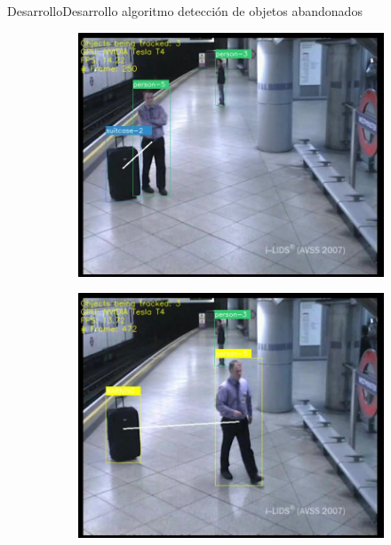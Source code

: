 \begin{frame}{Desarrollo}{Desarrollo algoritmo detección de objetos abandonados}
\begin{figure}[ht]
  \centering
  \begin{subfigure}[b]{0.28\textwidth}
    \includegraphics[width=\textwidth]{Images/desarrollo/link-persona-objeto.jpg}
    \caption{}
    \label{fig:avss2007_link}
  \end{subfigure}
  \qquad
  \begin{subfigure}[b]{0.28\textwidth}
    \includegraphics[width=\textwidth]{Images/desarrollo/warning-abandono.jpg}
    \caption{}
    \label{fig:avss2007_warning}
  \end{subfigure}
  \qquad
  \begin{subfigure}[b]{0.28\textwidth}

\end{subfigure}
\end{figure}
\end{frame}
